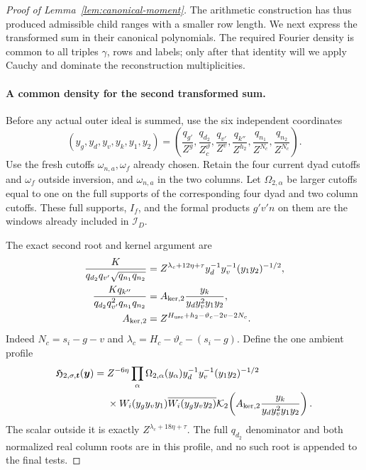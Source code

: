 \documentclass[12pt]{article}
\begin{document}
\begin{proof}[Proof of Lemma~\ref{lem:canonical-moment}]
The arithmetic construction has thus produced admissible child ranges
with a smaller row length. We next express the transformed sum in their
canonical polynomials. The required Fourier density is common to all
triples \(\gamma\), rows and labels; only after that identity will we
apply Cauchy and dominate the reconstruction multiplicities.

\paragraph{A common density for the second transformed sum.}
Before any actual outer ideal is summed, use the six independent coordinates
\[
 (y_g,y_d,y_v,y_k,y_1,y_2)
 =\left(\frac{q_{g'}}{Z^g},\frac{q_{d_2}}{Z^\vartheta_c},
 \frac{q_{v'}}{Z^v},\frac{q_{k''}}{Z^{h_2}},
 \frac{q_{n_1}}{Z^{N_c}},\frac{q_{n_2}}{Z^{N_c}}\right).
\]
Use the fresh cutoffs \(\omega_{n,a},\omega_f\) already chosen.
Retain the four current dyad cutoffs
and \(\omega_f\) outside inversion, and \(\omega_{n,a}\) in the two
columns.  Let \(\Omega_{2,\alpha}\) be larger cutoffs equal to one on
the full supports of the corresponding four dyad and two column
cutoffs.  These full supports, \(I_f\), and the formal products
\(g'v'n\) on them are the windows already included in \(\mathcal I_D\).

The exact second root and kernel argument are
\begin{equation}\label{eq:inverse-second-root-kernel}
 \begin{split}
 \frac{K}{q_{d_2}q_{v'}\sqrt{q_{n_1}q_{n_2}}}
 &=Z^{\lambda_c+12\eta+\tau}y_d^{-1}y_v^{-1}(y_1y_2)^{-1/2},\\
 \frac{Kq_{k''}}{q_{d_2}q_{v'}^2q_{n_1}q_{n_2}}
 &=A_{{\rm ker},2}\frac{y_k}{y_dy_v^2y_1y_2},\\
 A_{{\rm ker},2}&=Z^{H_{\rm use}+h_2-\vartheta_c-2v-2N_c}.
 \end{split}
\end{equation}
Indeed \(N_c=s_i-g-v\) and
\(\lambda_c=H_c-\vartheta_c-(s_i-g)\).  Define the one ambient profile
\begin{equation}\label{eq:inverse-second-profile}
 \begin{split}
 \mathfrak H_{2,\sigma,\boldsymbol t}(\boldsymbol y)={}&Z^{-6\eta}
 \prod_\alpha\Omega_{2,\alpha}(y_\alpha)
 y_d^{-1}y_v^{-1}(y_1y_2)^{-1/2}\\
 &\times W_i(y_gy_vy_1)\overline{W_i(y_gy_vy_2)}
 \mathcal K_2\!\left(A_{{\rm ker},2}\frac{y_k}{y_dy_v^2y_1y_2}\right).
 \end{split}
\end{equation}
The scalar outside it is exactly \(Z^{\lambda_c+18\eta+\tau}\).
The full \(q_{d_2}\) denominator and both normalized real column roots
are in this profile, and no such root is appended to the final tests.


\end{proof}
\end{document}
